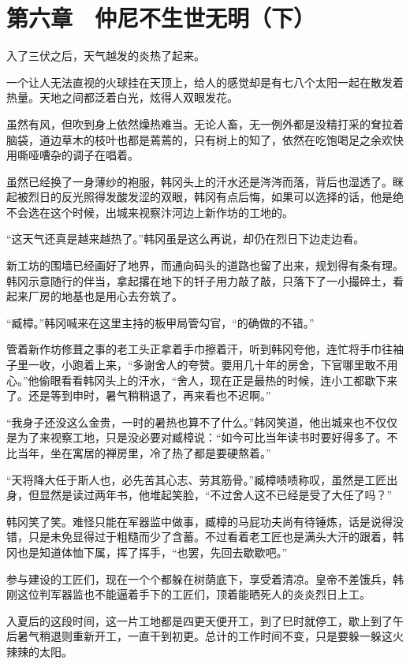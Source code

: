 \section{第六章　仲尼不生世无明（下）}

入了三伏之后，天气越发的炎热了起来。

一个让人无法直视的火球挂在天顶上，给人的感觉却是有七八个太阳一起在散发着热量。天地之间都泛着白光，炫得人双眼发花。

虽然有风，但吹到身上依然燥热难当。无论人畜，无一例外都是没精打采的耷拉着脑袋，道边草木的枝叶也都是蔫蔫的，只有树上的知了，依然在吃饱喝足之余欢快用嘶哑嘈杂的调子在唱着。

虽然已经换了一身薄纱的袍服，韩冈头上的汗水还是涔涔而落，背后也湿透了。眯起被烈日的反光照得发酸发涩的双眼，韩冈有点后悔，如果可以选择的话，他是绝不会选在这个时候，出城来视察汴河边上新作坊的工地的。

“这天气还真是越来越热了。”韩冈虽是这么再说，却仍在烈日下边走边看。

新工坊的围墙已经画好了地界，而通向码头的道路也留了出来，规划得有条有理。韩冈示意随行的伴当，拿起撂在地下的钎子用力敲了敲，只落下了一小撮碎土，看起来厂房的地基也是用心去夯筑了。

“臧樟。”韩冈喊来在这里主持的板甲局管勾官，“的确做的不错。”

管着新作坊修葺之事的老工头正拿着手巾擦着汗，听到韩冈夸他，连忙将手巾往袖子里一收，小跑着上来，“多谢舍人的夸赞。要用几十年的房舍，下官哪里敢不用心。”他偷眼看看韩冈头上的汗水，“舍人，现在正是最热的时候，连小工都歇下来了。还是等到申时，暑气稍稍退了，再来看也不迟啊。”

“我身子还没这么金贵，一时的暑热也算不了什么。”韩冈笑道，他出城来也不仅仅是为了来视察工地，只是没必要对臧樟说：“如今可比当年读书时要好得多了。不比当年，坐在寓居的禅房里，冷了热了都是要硬熬着。”

“天将降大任于斯人也，必先苦其心志、劳其筋骨。”臧樟啧啧称叹，虽然是工匠出身，但显然是读过两年书，他堆起笑脸，“不过舍人这不已经是受了大任了吗？”

韩冈笑了笑。难怪只能在军器监中做事，臧樟的马屁功夫尚有待锤炼，话是说得没错，只是未免显得过于粗糙而少了含蓄。不过看着老工匠也是满头大汗的跟着，韩冈也是知道体恤下属，挥了挥手，“也罢，先回去歇歇吧。”

参与建设的工匠们，现在一个个都躲在树荫底下，享受着清凉。皇帝不差饿兵，韩刚这位判军器监也不能逼着手下的工匠们，顶着能晒死人的炎炎烈日上工。

入夏后的这段时间，这一片工地都是四更天便开工，到了巳时就停工，歇上到了午后暑气稍退则重新开工，一直干到初更。总计的工作时间不变，只是要躲一躲这火辣辣的太阳。

